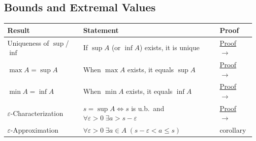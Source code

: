
\subsection{Bounds and Extremal Values}

\begin{tcolorbox}[colback=gray!6, colframe=gray!40, arc=2pt,
  left=6pt, right=6pt, top=4pt, bottom=4pt,
  title={\small\textbf{Bounds and Extremal Values — Quick Reference}},
  fonttitle=\small\bfseries]
\renewcommand{\arraystretch}{1.4}
\begin{tabular}{@{}p{} p{} p{}@{}}
\textbf{Result} & \textbf{Statement} & \textbf{Proof} \\
\midrule
Uniqueness of $\sup$/$\inf$
  & If $\sup A$ (or $\inf A$) exists, it is unique
  & \hyperref[prf:sup-is-unique]{Proof $\to$} \\
$\max A = \sup A$
  & When $\max A$ exists, it equals $\sup A$
  & \hyperref[prf:max-is-sup]{Proof $\to$} \\
$\min A = \inf A$
  & When $\min A$ exists, it equals $\inf A$
  & \hyperref[prf:min-is-inf]{Proof $\to$} \\
$\varepsilon$-Characterization
  & $s = \sup A \iff s$ is u.b.\ and $\forall \varepsilon{>}0\; \exists a{>}s{-}\varepsilon$
  & \hyperref[prf:supremum-approximation]{Proof $\to$} \\
$\varepsilon$-Approximation
  & $\forall \varepsilon{>}0\; \exists a \in A\; (s-\varepsilon < a \le s)$
  & corollary \\
\end{tabular}
\end{tcolorbox}


